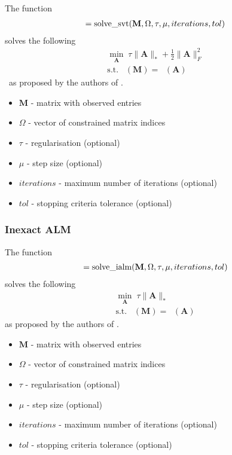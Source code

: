 \documentclass{article}
\DeclareMathOperator*{\pro}{\mathcal P_{\Omega}}
\begin{document}
The function
\begin{align}
[ \mathbf A, \mathbf{f\_values}, \mathbf{stop\_vals} ] = \text{solve\_svt}( \mathbf M, \Omega, \tau, \mu, iterations, tol )\notag 
\end{align}
solves the following
\begin{align}
\min_{\mathbf A} \; \tau \| \mathbf A \|_* +  \frac{1}{2} \| \mathbf{ A } \|_F^2 \\
\text{s.t.} \; \pro (\mathbf M) = \pro (\mathbf A) \nonumber 
\end{align}\
as proposed by the authors of \cite{cai2010singular}.

\begin{itemize}
\item $\mathbf M$ - matrix with observed entries
\item $\Omega$ - vector of constrained matrix indices
\item $\tau$ - regularisation (optional)
\item $\mu$ - step size (optional)
\item $iterations$ - maximum number of iterations (optional)
\item $tol$ - stopping criteria tolerance (optional)
\end{itemize}

\subsubsection{Inexact ALM}

The function
\begin{align}
[ \mathbf A, \mathbf{f\_vals}, \mathbf{stop\_vals} ] = \text{solve\_ialm}( \mathbf M, \Omega, \tau, \mu, iterations, tol )\notag 
\end{align}
solves the following
\begin{align}
\min_{\mathbf A} \; \tau \| \mathbf A \|_* \\
\text{s.t.} \; \pro (\mathbf M) = \pro (\mathbf A) \nonumber 
\end{align}
as proposed by the authors of \cite{lin2010augmented}.

\begin{itemize}
\item $\mathbf M$ - matrix with observed entries
\item $\Omega$ - vector of constrained matrix indices
\item $\tau$ - regularisation (optional)
\item $\mu$ - step size (optional)
\item $iterations$ - maximum number of iterations (optional)
\item $tol$ - stopping criteria tolerance (optional)
\end{itemize}
\end{document}

